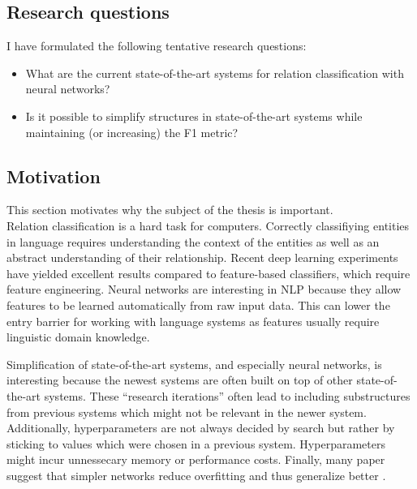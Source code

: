 \documentclass[12pt]{article}
\begin{document}
\subsection{Research questions}

I have formulated the following tentative research questions:
\begin{itemize}
    \item What are the current state-of-the-art systems for relation classification 
    with neural networks?\\
    \item Is it possible to simplify structures in state-of-the-art systems while maintaining (or increasing) the F1 metric?
\end{itemize}


\begin{center}
\end{center}


\subsection{Motivation}

This section motivates why the subject of the thesis is important.\\

Relation classification is a hard task for computers. Correctly classifiying entities in language requires understanding the context of the entities as well as an abstract understanding
of their relationship. Recent deep learning experiments have yielded excellent results compared to feature-based classifiers, which require feature engineering.  Neural networks are interesting in NLP because they allow features to be learned automatically from raw input data. This can lower the entry barrier for working with language systems as features usually require linguistic domain knowledge.  

Simplification of state-of-the-art systems, and especially neural networks, is interesting because the newest systems are often built on top of other state-of-the-art systems. These ``research iterations'' often
lead to including substructures from previous systems which might not be relevant in the newer system. Additionally, hyperparameters are not always decided by search but rather by sticking to values which were chosen in a previous system. Hyperparameters might incur unnessecary memory or performance costs. Finally, many paper suggest that simpler networks reduce overfitting and thus generalize better \cite{dropout}.
\end{document}
